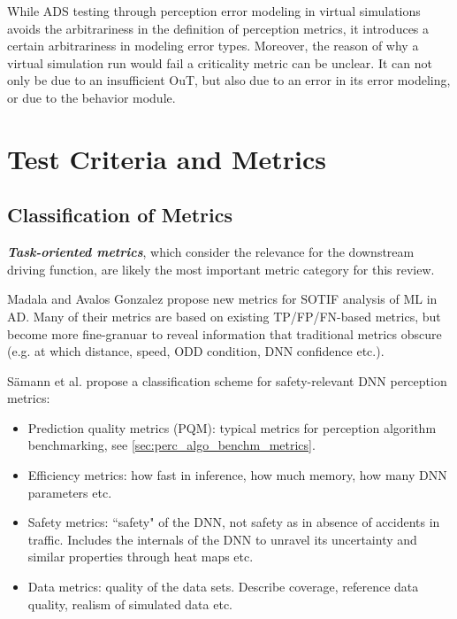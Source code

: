 \documentclass[conference]{IEEEtran}
\newcommand{\new}[1]{{\color{my-red}#1}}
\begin{document}
While ADS testing through perception error modeling in virtual simulations avoids the arbitrariness in the definition of perception metrics, it introduces a certain arbitrariness in modeling error types. 
Moreover, the reason of why a virtual simulation run would fail a criticality metric can be unclear.
It can not only be due to an insufficient OuT, but also due to an error in its error modeling, or due to the behavior module.


%
%




\section{Test Criteria and Metrics}
\label{sec:axis_criteria_metrics}

\subsection{\new{Classification of Metrics}}
\textit{\textbf{Task-oriented metrics}}, which consider the relevance for the downstream driving function, are likely the most important metric category for this review. 

Madala and Avalos Gonzalez \cite{Madala2023metrics} propose new metrics for SOTIF analysis of ML in AD. Many of their metrics are based on existing TP/FP/FN-based metrics, but become more fine-granuar to reveal information that traditional metrics obscure (e.g. at which distance, speed, ODD condition, DNN confidence etc.).


Sämann et al. \cite{Saemann2020strategy} propose a classification scheme for safety-relevant DNN perception metrics: 
\begin{itemize}
\item Prediction quality metrics (PQM): typical metrics for perception algorithm benchmarking, see \ref{sec:perc_algo_benchm_metrics}.
\item Efficiency metrics: how fast in inference, how much memory, how many DNN parameters etc.
\item Safety metrics: ``safety" of the DNN, not safety as in absence of accidents in traffic. Includes the internals of the DNN to unravel its uncertainty and similar properties through heat maps etc.
\item Data metrics: quality of the data sets. Describe coverage, reference data quality, realism of simulated data etc. 
\end{itemize}
\end{document}
